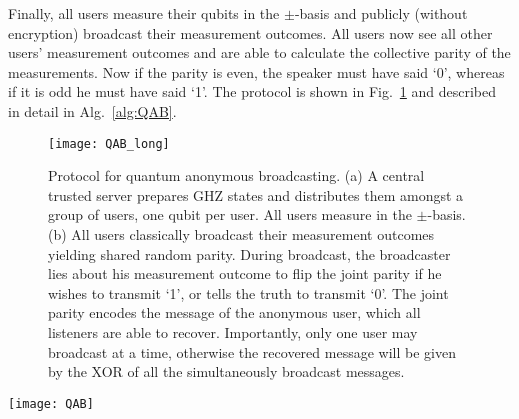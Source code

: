 Finally, all users measure their qubits in the $\pm$-basis and publicly (without encryption) broadcast their measurement outcomes. All users now see all other users' measurement outcomes and are able to calculate the collective parity of the measurements. Now if the parity is even, the speaker must have said `0', whereas if it is odd he must have said `1'. The protocol is shown in Fig.~\ref{fig:QAB} and described in detail in Alg.~\ref{alg:QAB}.

\doublecol
\begin{figure}[!htbp]
\texttt{[image: QAB\_long]}
\captionspacefig \caption{Protocol for quantum anonymous broadcasting. (a) A central trusted server prepares GHZ states and distributes them amongst a group of users, one qubit per user. All users measure in the $\pm$-basis. (b) All users classically broadcast their measurement outcomes yielding shared random parity. During broadcast, the broadcaster lies about his measurement outcome to flip the joint parity if he wishes to transmit `1', or tells the truth to transmit `0'. The joint parity encodes the message of the anonymous user, which all listeners are able to recover. Importantly, only one user may broadcast at a time, otherwise the recovered message will be given by the XOR of all the simultaneously broadcast messages.} \label{fig:QAB}
\end{figure}
\else
\begin{figure*}[!htbp]
\texttt{[image: QAB]}
\captionspacefig \caption{Protocol for quantum anonymous broadcasting. (a) A central trusted server prepares GHZ states and distributes them amongst a group of users, one qubit per user. All users measure in the $\pm$-basis. (b) All users classically broadcast their measurement outcomes yielding shared random parity. During broadcast, the broadcaster lies about his measurement outcome to flip the joint parity if he wishes to transmit `1', or tells the truth to transmit `0'. The joint parity encodes the message of the anonymous user, which all listeners are able to recover. Importantly, only one user may broadcast at a time, otherwise the recovered message will be given by the XOR of all the simultaneously broadcast messages.} \label{fig:QAB}
\end{figure*}
\fi

